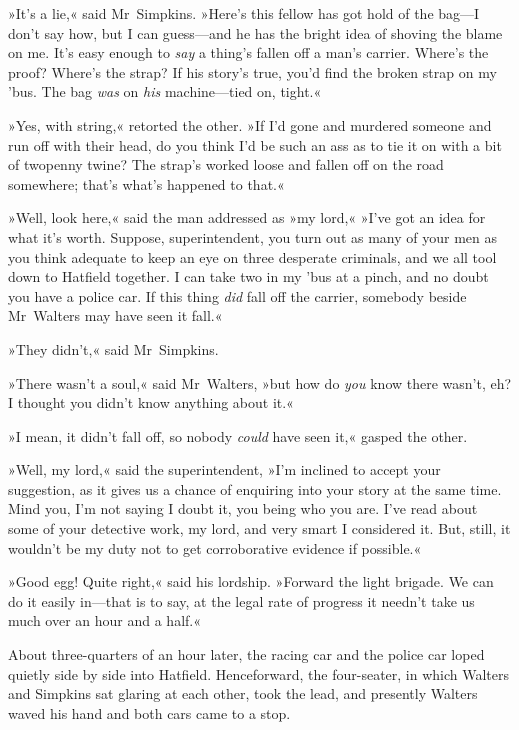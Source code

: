 »It's a lie,« said Mr~Simpkins. »Here's this fellow has got hold of the bag—I don't say how, but I can guess—and he has the bright idea of shoving the blame on me. It's easy enough to \textit{say} a thing's fallen off a man's carrier. Where's the proof? Where's the strap? If his story's true, you'd find the broken strap on my 'bus. The bag \textit{was} on \textit{his} machine—tied on, tight.«

»Yes, with string,« retorted the other. »If I'd gone and murdered someone and run off with their head, do you think I'd be such an ass as to tie it on with a bit of twopenny twine? The strap's worked loose and fallen off on the road somewhere; that's what's happened to that.«

»Well, look here,« said the man addressed as »my lord,« »I've got an idea for what it's worth. Suppose, superintendent, you turn out as many of your men as you think adequate to keep an eye on three desperate criminals, and we all tool down to Hatfield together. I can take two in my 'bus at a pinch, and no doubt you have a police car. If this thing \textit{did} fall off the carrier, somebody beside Mr~Walters may have seen it fall.«

»They didn't,« said Mr~Simpkins.

»There wasn't a soul,« said Mr~Walters, »but how do \textit{you} know there wasn't, eh? I thought you didn't know anything about it.«

»I mean, it didn't fall off, so nobody \textit{could} have seen it,« gasped the other.

»Well, my lord,« said the superintendent, »I'm inclined to accept your suggestion, as it gives us a chance of enquiring into your story at the same time. Mind you, I'm not saying I doubt it, you being who you are. I've read about some of your detective work, my lord, and very smart I considered it. But, still, it wouldn't be my duty not to get corroborative evidence if possible.«

»Good egg! Quite right,« said his lordship. »Forward the light brigade. We can do it easily in—that is to say, at the legal rate of progress it needn't take us much over an hour and a half.«

\divider
About three-quarters of an hour later, the racing car and the police car loped quietly side by side into Hatfield. Henceforward, the four-seater, in which Walters and Simpkins sat glaring at each other, took the lead, and presently Walters waved his hand and both cars came to a stop.

